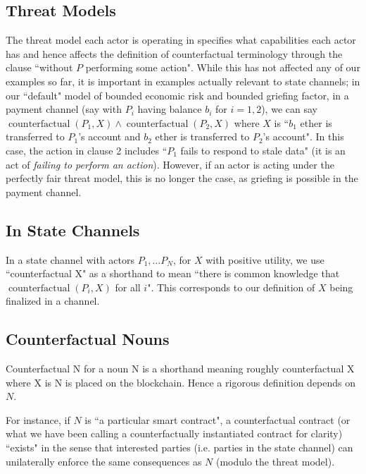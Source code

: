 \documentclass[prb,floatfix,reprint,nofootinbib,amsmath,amssymb,epsfig,pre,floats,letterpaper,groupedaffiliation,tightenlines,allcolors=blue,11pt]{revtex4}
\theoremstyle{definition}
\theoremstyle{definition}
\theoremstyle{definition}
\DeclareMathOperator{\counterfactual}{counterfactual}
\begin{document}
\begin{appendix}
\subsection{Threat Models}

The threat model each actor is operating in specifies what capabilities each actor has and hence affects the definition of counterfactual terminology through the clause ``without $P$ performing some action". While this has not affected any of our examples so far, it is important in examples actually relevant to state channels; in our ``default" model of bounded economic risk and bounded griefing factor, in a payment channel (say with $P_i$ having balance $b_i$ for $i=1,2$), we can say $\counterfactual(P_1, X) \wedge \counterfactual(P_2, X)$ where $X$ is ``$b_1$ ether is transferred to $P_1$'s account and $b_2$ ether is transferred to $P_2$'s account". In this case, the action in clause 2 includes ``$P_1$ fails to respond to stale data" (it is an act of \textit{failing to perform an action}). However, if an actor is acting under the perfectly fair threat model, this is no longer the case, as griefing is possible in the payment channel.

\subsection{In State Channels}
\label{sec:instatechannels}

In a state channel with actors $P_1, \ldots P_N$, for $X$ with positive utility, we use ``counterfactual X" as a shorthand to mean ``there is common knowledge that $\counterfactual(P_i, X)$ for all $i$". This corresponds to our definition of $X$ being finalized in a channel.

\subsection{Counterfactual Nouns}

Counterfactual N for a noun N is a shorthand meaning roughly counterfactual X where X is N is placed on the blockchain. Hence a rigorous definition depends on $N$.

For instance, if $N$ is ``a particular smart contract", a counterfactual contract (or what we have been calling a counterfactually instantiated contract for clarity) ``exists" in the sense that interested parties (i.e. parties in the state channel) can unilaterally enforce the same consequences as $N$ (modulo the threat model).


\end{appendix}
\end{document}
